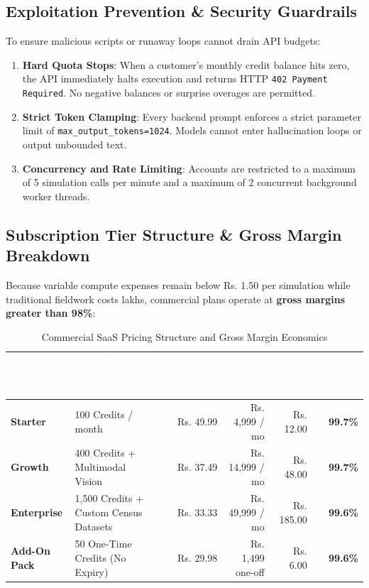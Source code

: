 \documentclass[11pt,a4paper]{article}
\begin{document}
\subsection{Exploitation Prevention \& Security Guardrails}
To ensure malicious scripts or runaway loops cannot drain API budgets:
\begin{enumerate}[noitemsep]
  \item \textbf{Hard Quota Stops}: When a customer's monthly credit balance hits zero, the API immediately halts execution and returns HTTP \texttt{402 Payment Required}. No negative balances or surprise overages are permitted.
  \item \textbf{Strict Token Clamping}: Every backend prompt enforces a strict parameter limit of \texttt{max\_output\_tokens=1024}. Models cannot enter hallucination loops or output unbounded text.
  \item \textbf{Concurrency and Rate Limiting}: Accounts are restricted to a maximum of 5 simulation calls per minute and a maximum of 2 concurrent background worker threads.
\end{enumerate}

\subsection{Subscription Tier Structure \& Gross Margin Breakdown}
Because variable compute expenses remain below Rs. 1.50 per simulation while traditional fieldwork costs lakhs, commercial plans operate at \textbf{gross margins greater than 98\%}:

\begin{table}[htbp]
\centering
\small
\setlength{\aboverulesep}{0pt}
\setlength{\belowrulesep}{0pt}
\setlength{\tabcolsep}{3.5pt}
\renewcommand{\arraystretch}{1.25}
\begin{tabularx}{\textwidth}{l X r r r r}
\toprule
\rowcolor{tblheaderblue}
\textcolor{white}{\textbf{Plan Tier}} & 
\textcolor{white}{\textbf{Included Monthly Allowance}} & 
\textcolor{white}{\textbf{Rate/Credit}} & 
\textcolor{white}{\textbf{Price (INR)}} & 
\textcolor{white}{\textbf{OpEx Cost}} & 
\textcolor{white}{\textbf{Gross Margin}} \\
\midrule
\textbf{Starter} & 100 Credits / month & Rs. 49.99 & Rs. 4,999 / mo & ~Rs. 12.00 & \textbf{99.7\%} \\
\textbf{Growth} & 400 Credits + Multimodal Vision & Rs. 37.49 & Rs. 14,999 / mo & ~Rs. 48.00 & \textbf{99.7\%} \\
\textbf{Enterprise} & 1,500 Credits + Custom Census Datasets & Rs. 33.33 & Rs. 49,999 / mo & ~Rs. 185.00 & \textbf{99.6\%} \\
\textbf{Add-On Pack} & 50 One-Time Credits (No Expiry) & Rs. 29.98 & Rs. 1,499 one-off & ~Rs. 6.00 & \textbf{99.6\%} \\
\bottomrule
\end{tabularx}
\caption{Commercial SaaS Pricing Structure and Gross Margin Economics}
\label{tab:saas_pricing}
\end{table}
\end{document}
